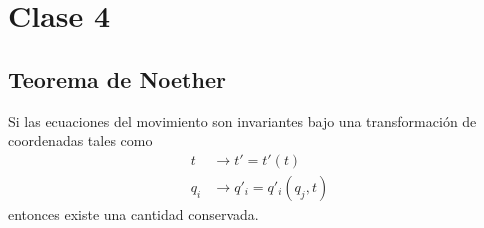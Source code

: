 \section{Clase 4}\label{clase-4}
\subsection{Teorema de Noether}
\begin{tcolorbox}
\begin{teor}
Si las ecuaciones del movimiento son invariantes bajo una transformación de coordenadas tales como
\begin{align}
  t&\to t'=t'(t)\\
  q_i&\to q'_i=q'_i(q_j,t)
\end{align}
entonces existe una cantidad conservada.
\end{teor}
\end{tcolorbox}

